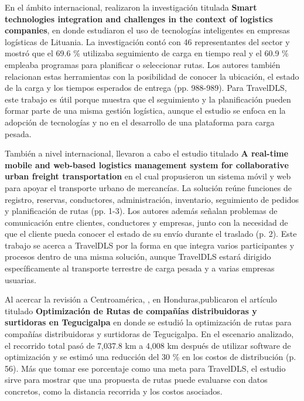 \label{ant:pauzuoliene}
En el ámbito internacional, \textcite{pauzuoliene2024smart} realizaron la investigación titulada \textbf{Smart technologies integration and challenges in the context of logistics companies}, en donde estudiaron el uso de tecnologías inteligentes en empresas logísticas de Lituania. La investigación contó con 46 representantes del sector y mostró que el 69.6 \% utilizaba seguimiento de carga en tiempo real y el 60.9 \% empleaba programas para planificar o seleccionar rutas. Los autores también relacionan estas herramientas con la posibilidad de conocer la ubicación, el estado de la carga y los tiempos esperados de entrega (pp. 988-989). Para TravelDLS, este trabajo es útil porque muestra que el seguimiento y la planificación pueden formar parte de una misma gestión logística, aunque el estudio se enfoca en la adopción de tecnologías y no en el desarrollo de una plataforma para carga pesada.

\label{ant:sultan}
También a nivel internacional, \textcite{sultan2022real} llevaron a cabo el estudio titulado \textbf{A real-time mobile and web-based logistics management system for collaborative urban freight transportation} en el cual propusieron un sistema móvil y web para apoyar el transporte urbano de mercancías. La solución reúne funciones de registro, reservas, conductores, administración, inventario, seguimiento de pedidos y planificación de rutas (pp. 1-3). Los autores además señalan problemas de comunicación entre clientes, conductores y empresas, junto con la necesidad de que el cliente pueda conocer el estado de su envío durante el traslado (p. 2). Este trabajo se acerca a TravelDLS por la forma en que integra varios participantes y procesos dentro de una misma solución, aunque TravelDLS estará dirigido específicamente al transporte terrestre de carga pesada y a varias empresas usuarias.

\label{ant:aguilar}
Al acercar la revisión a Centroamérica, \textcite{aguilar2022optimizacion}, en Honduras,publicaron el artículo titulado \textbf{Optimización de Rutas de compañías distribuidoras y surtidoras en Tegucigalpa} en donde se estudió la optimización de rutas para compañías distribuidoras y surtidoras de Tegucigalpa. En el escenario analizado, el recorrido total pasó de 7,037.8 km a 4,008 km después de utilizar software de optimización y se estimó una reducción del 30 \% en los costos de distribución (p. 56). Más que tomar ese porcentaje como una meta para TravelDLS, el estudio sirve para mostrar que una propuesta de rutas puede evaluarse con datos concretos, como la distancia recorrida y los costos asociados.

